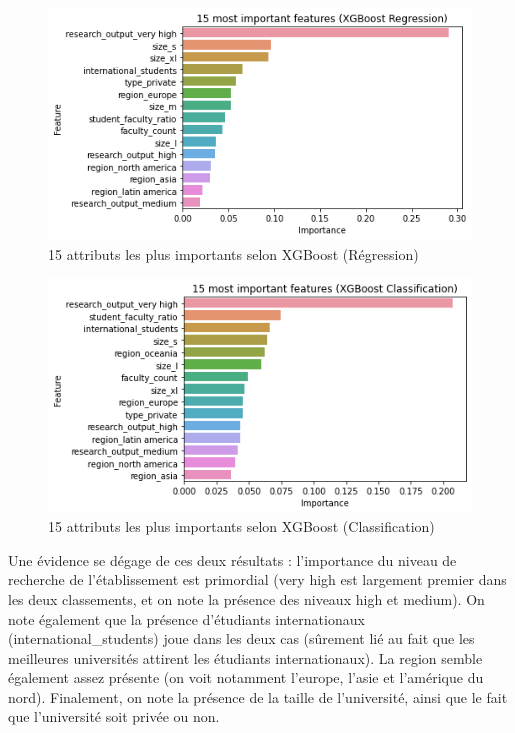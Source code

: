 \documentclass[twocolumns]{udes_rapport}
\begin{document}
        \begin{figure}[h!]
            \centering
            \includegraphics[scale=0.5]{Images/important_features_xgbreg.png}
            \caption{15 attributs les plus importants selon XGBoost (Régression)}
            \label{fig:imp_features_xgbreg}
        \end{figure}
        \begin{figure}[h!]
            \centering
            \includegraphics[scale=0.5]{Images/important_features_xgbclf.png}
            \caption{15 attributs les plus importants selon XGBoost (Classification)}
            \label{fig:imp_features_xgbclf}
        \end{figure}

        Une évidence se dégage de ces deux résultats : l'importance du niveau de recherche de l'établissement est primordial (\textsf{very high} est largement premier dans les deux classements, et on note la présence des niveaux \textsf{high} et \textsf{medium}). On note également que la présence d'étudiants internationaux (\textsf{international\_students}) joue dans les deux cas (sûrement lié au fait que les meilleures universités attirent les étudiants internationaux). La region semble également assez présente (on voit notamment l'europe, l'asie et l'amérique du nord). Finalement, on note la présence de la taille de l'université, ainsi que le fait que l'université soit privée ou non.
        
\end{document}

